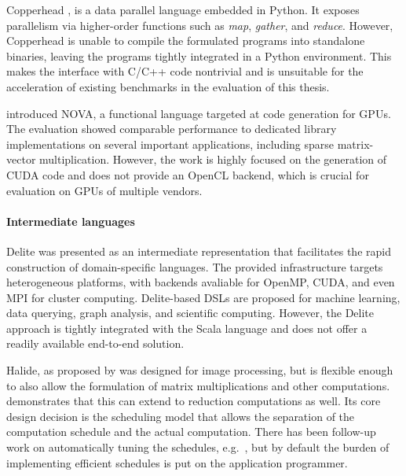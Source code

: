     Copperhead \citep{catanzaro11copperhead}, is a data parallel language
    embedded in Python.
    It exposes parallelism via higher-order functions such as {\it map},
    {\it gather}, and {\it reduce}.
    However, Copperhead is unable to compile the formulated programs into
    standalone binaries, leaving the programs tightly integrated in a Python
    environment.
    This makes the interface with C/C++ code nontrivial and is unsuitable for
    the acceleration of existing benchmarks in the evaluation of this thesis.

    \citet{collins14nova} introduced NOVA, a functional language targeted at
    code generation for GPUs.
    The evaluation showed comparable performance to dedicated library
    implementations on several important applications, including sparse
    matrix-vector multiplication.
    However, the work is highly focused on the generation of CUDA code and does
    not provide an OpenCL backend, which is crucial for evaluation on GPUs of
    multiple vendors.

    \paragraph*{Intermediate languages}
    Delite \citep{Sujeeth:2014:DCA:2601432.2584665} was presented as an
    intermediate representation that facilitates the rapid construction of
    domain-specific languages.
    The provided infrastructure targets heterogeneous
    platforms, with backends avaliable for OpenMP, CUDA, and even MPI for
    cluster computing.
    Delite-based DSLs are proposed for machine learning, data querying, graph
    analysis, and scientific computing.
    However, the Delite approach is tightly integrated with the Scala
    language and does not offer a readily available end-to-end solution.

    Halide, as proposed by \citet{Ragan-Kelley:2013:HLC:2499370.2462176}
    was designed for image processing, but is flexible enough to also allow the 
    formulation of matrix multiplications and other computations.
    \citet{Suriana:2017:PAR:3049832.3049863} demonstrates that this can extend
    to reduction computations as well.
    Its core design decision is the scheduling model that allows the separation
    of the computation schedule and the actual computation.
    There has been follow-up work on automatically tuning the schedules, e.g.\ 
    \citet{Mullapudi:2016:ASH:2897824.2925952}, but by default the burden of
    implementing efficient schedules is put on the application programmer.

